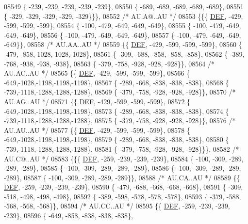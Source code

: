 \begin{DoxyCode}
08549 \{ -239, -239, -239, -239, -239\},
08550 \{ -689, -689, -689, -689, -689\},
08551 \{ -329, -329, -329, -329, -329\}\}\},
08552 \textcolor{comment}{/* AU.A@..AU */}
08553 \{\{\{  \mbox{\hyperlink{1_88_84__epars_8h_a397419fc12b37ed479c8abb9d444d843}{DEF}}, -429, -599, -599, -599\},
08554 \{ -100, -479, -649, -649, -649\},
08555 \{ -100, -479, -649, -649, -649\},
08556 \{ -100, -479, -649, -649, -649\},
08557 \{ -100, -479, -649, -649, -649\}\},
08558 \textcolor{comment}{/* AU.AA..AU */}
08559 \{\{  \mbox{\hyperlink{1_88_84__epars_8h_a397419fc12b37ed479c8abb9d444d843}{DEF}}, -429, -599, -599, -599\},
08560 \{ -479, -858,-1028,-1028,-1028\},
08561 \{ -309, -688, -858, -858, -858\},
08562 \{ -389, -768, -938, -938, -938\},
08563 \{ -379, -758, -928, -928, -928\}\},
08564 \textcolor{comment}{/* AU.AC..AU */}
08565 \{\{  \mbox{\hyperlink{1_88_84__epars_8h_a397419fc12b37ed479c8abb9d444d843}{DEF}}, -429, -599, -599, -599\},
08566 \{ -649,-1028,-1198,-1198,-1198\},
08567 \{ -289, -668, -838, -838, -838\},
08568 \{ -739,-1118,-1288,-1288,-1288\},
08569 \{ -379, -758, -928, -928, -928\}\},
08570 \textcolor{comment}{/* AU.AG..AU */}
08571 \{\{  \mbox{\hyperlink{1_88_84__epars_8h_a397419fc12b37ed479c8abb9d444d843}{DEF}}, -429, -599, -599, -599\},
08572 \{ -649,-1028,-1198,-1198,-1198\},
08573 \{ -289, -668, -838, -838, -838\},
08574 \{ -739,-1118,-1288,-1288,-1288\},
08575 \{ -379, -758, -928, -928, -928\}\},
08576 \textcolor{comment}{/* AU.AU..AU */}
08577 \{\{  \mbox{\hyperlink{1_88_84__epars_8h_a397419fc12b37ed479c8abb9d444d843}{DEF}}, -429, -599, -599, -599\},
08578 \{ -649,-1028,-1198,-1198,-1198\},
08579 \{ -289, -668, -838, -838, -838\},
08580 \{ -739,-1118,-1288,-1288,-1288\},
08581 \{ -379, -758, -928, -928, -928\}\}\},
08582 \textcolor{comment}{/* AU.C@..AU */}
08583 \{\{\{  \mbox{\hyperlink{1_88_84__epars_8h_a397419fc12b37ed479c8abb9d444d843}{DEF}}, -259, -239, -239, -239\},
08584 \{ -100, -309, -289, -289, -289\},
08585 \{ -100, -309, -289, -289, -289\},
08586 \{ -100, -309, -289, -289, -289\},
08587 \{ -100, -309, -289, -289, -289\}\},
08588 \textcolor{comment}{/* AU.CA..AU */}
08589 \{\{  \mbox{\hyperlink{1_88_84__epars_8h_a397419fc12b37ed479c8abb9d444d843}{DEF}}, -259, -239, -239, -239\},
08590 \{ -479, -688, -668, -668, -668\},
08591 \{ -309, -518, -498, -498, -498\},
08592 \{ -389, -598, -578, -578, -578\},
08593 \{ -379, -588, -568, -568, -568\}\},
08594 \textcolor{comment}{/* AU.CC..AU */}
08595 \{\{  \mbox{\hyperlink{1_88_84__epars_8h_a397419fc12b37ed479c8abb9d444d843}{DEF}}, -259, -239, -239, -239\},
08596 \{ -649, -858, -838, -838, -838\},

\end{DoxyCode}

